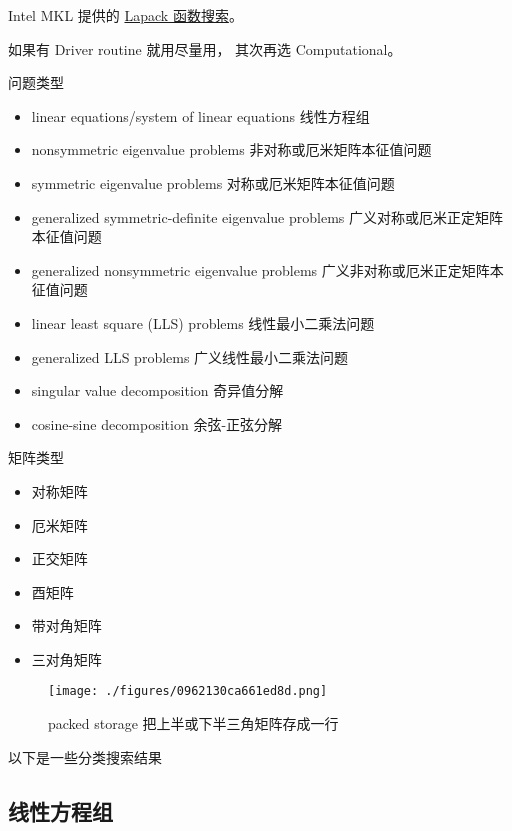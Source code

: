 
\begin{issues}
\issueDraft
\end{issues}


Intel MKL 提供的 \href{https://www.intel.com/content/www/us/en/developer/tools/oneapi/onemkl-function-finding-advisor.html}{Lapack 函数搜索}。

如果有 Driver routine 就用尽量用， 其次再选 Computational。

问题类型
\begin{itemize}
\item linear equations/system of linear equations 线性方程组
\item nonsymmetric eigenvalue problems 非对称或厄米矩阵本征值问题
\item symmetric eigenvalue problems 对称或厄米矩阵本征值问题
\item generalized symmetric-definite eigenvalue problems 广义对称或厄米正定矩阵本征值问题
\item generalized nonsymmetric eigenvalue problems 广义非对称或厄米正定矩阵本征值问题
\item linear least square (LLS) problems 线性最小二乘法问题
\item generalized LLS problems 广义线性最小二乘法问题
\item singular value decomposition 奇异值分解
\item cosine-sine decomposition 余弦-正弦分解
\end{itemize}

矩阵类型
\begin{itemize}
\item 对称矩阵
\item 厄米矩阵
\item 正交矩阵
\item 酉矩阵
\item 带对角矩阵
\item 三对角矩阵
\end{itemize}

\begin{figure}[ht]
\centering
\texttt{[image: ./figures/0962130ca661ed8d.png]}
\caption{packed storage 把上半或下半三角矩阵存成一行} \label{fig_Lapack_1}
\end{figure}

以下是一些分类搜索结果

\subsection{线性方程组}
